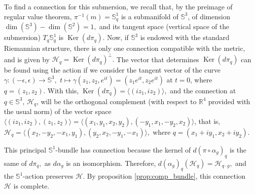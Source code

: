 \documentclass[12pt, letterpaper, reqno]{amsart}
\theoremstyle{definition}
\theoremstyle{plain}
\theoremstyle{remark}
\begin{document}
	To find a connection for this submersion, we recall that, by the preimage of regular value theorem, $ \pi^{-1}(m) = \mathbb{S}^1_q $ is a submanifold of $ \mathbb{S}^3 $, of dimension $ \operatorname{dim}( \mathbb{S}^3)- \operatorname{dim}( \mathbb{S}^2) = 1,  $ and its tangent space (vertical space of the submersion) $ T_q \mathbb{S}^1_q $ is $ \operatorname{Ker}(d\pi_q)  $. Now, if $ \mathbb{S}^3 $ is endowed with the standard Riemannian structure, there is only one connection compatible with the metric, and is given by $ \mathcal{H}_q = \operatorname{Ker}(d\pi_q)^\perp. $ The vector that determines $ \operatorname{Ker}(d\pi_q)  $ can be found using the action if we consider the tangent vector of the curve $ \gamma: (-\epsilon, \epsilon) \rightarrow \mathbb{S}^3, $ $ t\mapsto \gamma(z_1,z_2, e^{it})=(z_1e^{it},z_2e^{it}) $ at $ t=0 $, where $ q=(z_1,z_2). $ With this, $ \operatorname{Ker}(d\pi_q) = \langle(iz_1, iz_2)\rangle,  $ and the connection at $ q\in \mathbb{S}^3 $,  $ \mathcal{H}_q $, will be the orthogonal complement (with respect to $ \mathbb{R}^4 $ provided with the usual norm) of the vector space $ \langle(iz_1,iz_2), (z_1,z_2)\rangle  {= \langle(x_1,y_1,x_2,y_2), (-y_1,x_1,-y_2,x_2)\rangle}$, that is, $ \mathcal{H}_q = \langle(x_2,-y_2,-x_1,y_1),(y_2,x_2,-y_1,-x_1)\rangle, $ where $ q=(x_1+iy_1, x_2+iy_2). $   

	This principal $ \mathbb{S}^1$-bundle has connection because the kernel of $ d(\pi\circ \alpha_g)_q $ is the same of $ d\pi_q, $ as $ d\alpha_g $ is an isomorphism. Therefore, $ d(\alpha_g)_q ( \mathcal{H}_q) = \mathcal{H}_{q\cdot g}, $ and the $ \mathbb{S}^1 $-action preserves $ \mathcal{H}. $ By proposition \ref{prop:comp_bundle}, this connection $ \mathcal{H} $ is complete.  
 
\end{document}
